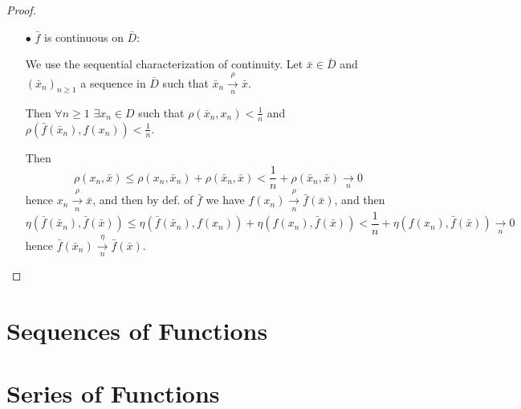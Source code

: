 \documentclass[12pt]{amsbook}
\theoremstyle{definition}
\begin{document}
\begin{proof}
\begin{itemize}
\begin{itemize}
\item[$\bullet$] $\bar f$ is continuous on $\bar D$:

We use the sequential characterization of continuity. Let $\bar x \in \bar D$ and $(\bar x_n)_{n \geq 1}$ a sequence in $\bar D$ such that $\bar x_n \xrightarrow[n]{\rho} \bar x$.

Then $\forall n \geq 1$ $\exists x_n \in D$ such that $\rho(\bar x_n, x_n) < \frac{1}{n}$ and $\rho(\bar f(\bar x_n), f(x_n)) < \frac{1}{n}$. %

Then
\begin{equation*}
\rho(x_n, \bar x) \leq \rho(x_n, \bar x_n) + \rho(\bar x_n, \bar x) < \frac{1}{n} + \rho(\bar x_n, \bar x) \xrightarrow[n]{} 0
\end{equation*}
hence $x_n \xrightarrow[n]\rho \bar x$, and then by def. of $\bar f$ we have $f(x_n) \xrightarrow[n]\rho \bar f(\bar x)$, and then
\begin{equation*}
\eta(\bar f(\bar x_n), \bar f(\bar x)) \leq \eta(\bar f(\bar x_n), f(x_n)) + \eta(f(x_n), \bar f(\bar x)) < \frac{1}{n} + \eta(f(x_n), \bar f(\bar x)) \xrightarrow[n]{} 0
\end{equation*}
hence $\bar f(\bar x_n) \xrightarrow[n]\eta \bar f(\bar x)$.
\end{itemize}
\end{itemize}
\end{proof}

\section{Sequences of Functions}

\section{Series of Functions}
\end{document}
